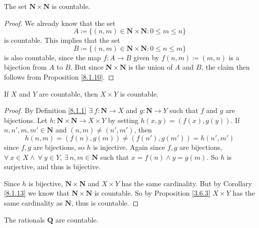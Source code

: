 \begin{corollary}\label{8.1.13}
The set \(\mathbf{N} \times \mathbf{N}\) is countable.
\end{corollary}

\begin{proof}
We already know that the set
\[
    A \coloneqq \{(n, m) \in \mathbf{N} \times \mathbf{N} : 0 \leq m \leq n\}
\]
is countable.
This implies that the set
\[
    B \coloneqq \{(n, m) \in \mathbf{N} \times \mathbf{N} : 0 \leq n \leq m\}
\]
is also countable, since the map \(f : A \to B\) given by \(f(n, m) \coloneqq (m, n)\) is a bijection from \(A\) to \(B\).
But since \(\mathbf{N} \times \mathbf{N}\) is the union of \(A\) and \(B\), the claim then follows from Proposition \ref{8.1.10}.
\end{proof}

\begin{corollary}\label{8.1.14}
If \(X\) and \(Y\) are countable, then \(X \times Y\) is countable.
\end{corollary}

\begin{proof}
By Definition \ref{8.1.1} \(\exists\ f : \mathbf{N} \to X\) and \(g : \mathbf{N} \to Y\) such that \(f\) and \(g\) are bijections.
Let \(h : \mathbf{N} \times \mathbf{N} \to X \times Y\) by setting \(h(x, y) = (f(x), g(y))\).
If \(n, n', m, m' \in \mathbf{N}\) and \((n, m) \neq (n', m')\), then
\[
    h(n, m) = (f(n), g(m)) \neq (f(n'), g(m')) = h(n', m')
\]
since \(f, g\) are bijections, so \(h\) is injective.
Again since \(f, g\) are bijections, \(\forall\ x \in X \land \ \forall\ y \in Y\), \(\exists\ n, m \in \mathbf{N}\) such that \(x = f(n) \land y = g(m)\).
So \(h\) is surjective, and thus is bijective.

Since \(h\) is bijective, \(\mathbf{N} \times \mathbf{N}\) and \(X \times Y\) has the same cardinality.
But by Corollary \ref{8.1.13} we know that \(\mathbf{N} \times \mathbf{N}\) is countable.
So by Proposition \ref{3.6.3} \(X \times Y\) has the same cardinality as \(\mathbf{N}\), thus is countable.
\end{proof}

\begin{corollary}\label{8.1.15}
The rationals \(\mathbf{Q}\) are countable.
\end{corollary}

